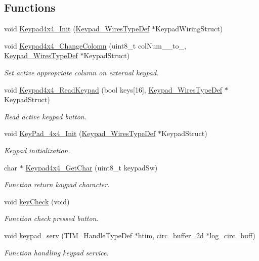 \subsection*{Functions}
\begin{DoxyCompactItemize}
\item 
void \hyperlink{group___key_pad___functions_gaac942a10ebab5bbc3df7e6a5d3dac8d8}{Keypad4x4\+\_\+\+Init} (\hyperlink{struct_keypad___wires_type_def}{Keypad\+\_\+\+Wires\+Type\+Def} $\ast$Keypad\+Wiring\+Struct)
\item 
void \hyperlink{group___key_pad___functions_gaaec8bb627a84f20257e155a5c62d6365}{Keypad4x4\+\_\+\+Change\+Colomn} (uint8\+\_\+t col\+Num\+\_\+\_\+to\+\_, \hyperlink{struct_keypad___wires_type_def}{Keypad\+\_\+\+Wires\+Type\+Def} $\ast$Keypad\+Struct)
\begin{DoxyCompactList}\small\item\em Set active appropriate column on external keypad. \end{DoxyCompactList}\item 
void \hyperlink{group___key_pad___functions_ga1cd1795849837cdb6eab0531b0fe9996}{Keypad4x4\+\_\+\+Read\+Keypad} (bool keys\mbox{[}16\mbox{]}, \hyperlink{struct_keypad___wires_type_def}{Keypad\+\_\+\+Wires\+Type\+Def} $\ast$Keypad\+Struct)
\begin{DoxyCompactList}\small\item\em Read active keypad button. \end{DoxyCompactList}\item 
void \hyperlink{group___key_pad___functions_gab61c53c156f7de52d60558afe0b11216}{Key\+Pad\+\_\+4x4\+\_\+\+Init} (\hyperlink{struct_keypad___wires_type_def}{Keypad\+\_\+\+Wires\+Type\+Def} $\ast$Keypad\+Struct)
\begin{DoxyCompactList}\small\item\em Keypad initialization. \end{DoxyCompactList}\item 
char $\ast$ \hyperlink{group___key_pad___functions_ga3df556ff06c042ed56d225250acb88bf}{Keypad4x4\+\_\+\+Get\+Char} (uint8\+\_\+t keypad\+Sw)
\begin{DoxyCompactList}\small\item\em Function return kaypad character. \end{DoxyCompactList}\item 
void \hyperlink{group___key_pad___functions_ga3a9e33c6b18f4e6bcdb841ac76286a87}{key\+Check} (void)
\begin{DoxyCompactList}\small\item\em Function check pressed button. \end{DoxyCompactList}\item 
void \hyperlink{group___key_pad___functions_ga0d78ad3fd18fa45e674df471b530c3a2}{keypad\+\_\+serv} (T\+I\+M\+\_\+\+Handle\+Type\+Def $\ast$htim, \hyperlink{structcirc__buffer__2d}{circ\+\_\+buffer\+\_\+2d} $\ast$\hyperlink{main_8c_ae1fd753c7ac0d6e839e1aa5ab4b04dd3}{log\+\_\+circ\+\_\+buff})
\begin{DoxyCompactList}\small\item\em Function handling keypad service. \end{DoxyCompactList}\end{DoxyCompactItemize}

